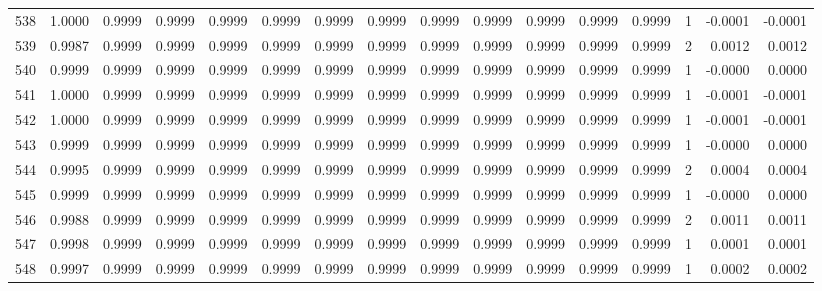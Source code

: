 \begin{tabular}{lrrrrrrrrrrrrrrr}
538 &      1.0000 &  0.9999 &  0.9999 &  0.9999 &  0.9999 &  0.9999 &  0.9999 &  0.9999 &  0.9999 &  0.9999 &   0.9999 &     0.9999 &      1 &                   -0.0001 &                    -0.0001 \\
539 &      0.9987 &  0.9999 &  0.9999 &  0.9999 &  0.9999 &  0.9999 &  0.9999 &  0.9999 &  0.9999 &  0.9999 &   0.9999 &     0.9999 &      2 &                    0.0012 &                     0.0012 \\
540 &      0.9999 &  0.9999 &  0.9999 &  0.9999 &  0.9999 &  0.9999 &  0.9999 &  0.9999 &  0.9999 &  0.9999 &   0.9999 &     0.9999 &      1 &                   -0.0000 &                     0.0000 \\
541 &      1.0000 &  0.9999 &  0.9999 &  0.9999 &  0.9999 &  0.9999 &  0.9999 &  0.9999 &  0.9999 &  0.9999 &   0.9999 &     0.9999 &      1 &                   -0.0001 &                    -0.0001 \\
542 &      1.0000 &  0.9999 &  0.9999 &  0.9999 &  0.9999 &  0.9999 &  0.9999 &  0.9999 &  0.9999 &  0.9999 &   0.9999 &     0.9999 &      1 &                   -0.0001 &                    -0.0001 \\
543 &      0.9999 &  0.9999 &  0.9999 &  0.9999 &  0.9999 &  0.9999 &  0.9999 &  0.9999 &  0.9999 &  0.9999 &   0.9999 &     0.9999 &      1 &                   -0.0000 &                     0.0000 \\
544 &      0.9995 &  0.9999 &  0.9999 &  0.9999 &  0.9999 &  0.9999 &  0.9999 &  0.9999 &  0.9999 &  0.9999 &   0.9999 &     0.9999 &      2 &                    0.0004 &                     0.0004 \\
545 &      0.9999 &  0.9999 &  0.9999 &  0.9999 &  0.9999 &  0.9999 &  0.9999 &  0.9999 &  0.9999 &  0.9999 &   0.9999 &     0.9999 &      1 &                   -0.0000 &                     0.0000 \\
546 &      0.9988 &  0.9999 &  0.9999 &  0.9999 &  0.9999 &  0.9999 &  0.9999 &  0.9999 &  0.9999 &  0.9999 &   0.9999 &     0.9999 &      2 &                    0.0011 &                     0.0011 \\
547 &      0.9998 &  0.9999 &  0.9999 &  0.9999 &  0.9999 &  0.9999 &  0.9999 &  0.9999 &  0.9999 &  0.9999 &   0.9999 &     0.9999 &      1 &                    0.0001 &                     0.0001 \\
548 &      0.9997 &  0.9999 &  0.9999 &  0.9999 &  0.9999 &  0.9999 &  0.9999 &  0.9999 &  0.9999 &  0.9999 &   0.9999 &     0.9999 &      1 &                    0.0002 &                     0.0002 \\

\end{tabular}

